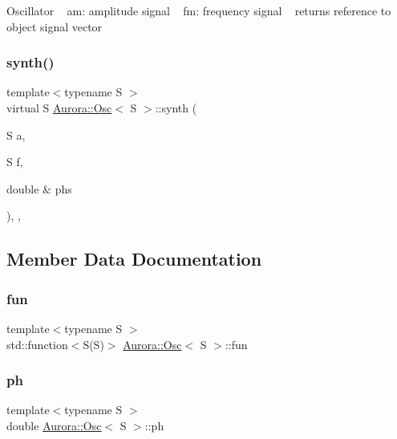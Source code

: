 Oscillator ~\newline
am\+: amplitude signal ~\newline
fm\+: frequency signal ~\newline
returns reference to object signal vector \mbox{\label{class_aurora_1_1_osc_a4e01fb1238c931c944b6b27c3790495e}} 
\subsubsection{\texorpdfstring{synth()}{synth()}}
{\footnotesize\ttfamily template$<$typename S $>$ \\
virtual S \hyperlink{class_aurora_1_1_osc}{Aurora\+::\+Osc}$<$ S $>$\+::synth (\begin{DoxyParamCaption}\item[{S}]{a,  }\item[{S}]{f,  }\item[{double \&}]{phs }\end{DoxyParamCaption})\hspace{0.3cm}{\ttfamily [inline]}, {\ttfamily [protected]}, {\ttfamily [virtual]}}



\subsection{Member Data Documentation}
\mbox{\label{class_aurora_1_1_osc_a18c443a23a6d1fc2e63ba1ee09e97bc4}} 
\subsubsection{\texorpdfstring{fun}{fun}}
{\footnotesize\ttfamily template$<$typename S $>$ \\
std\+::function$<$S(S)$>$ \hyperlink{class_aurora_1_1_osc}{Aurora\+::\+Osc}$<$ S $>$\+::fun\hspace{0.3cm}{\ttfamily [protected]}}

\mbox{\label{class_aurora_1_1_osc_ac649d41b585b377b17eeba66a18dbcc2}} 
\subsubsection{\texorpdfstring{ph}{ph}}
{\footnotesize\ttfamily template$<$typename S $>$ \\
double \hyperlink{class_aurora_1_1_osc}{Aurora\+::\+Osc}$<$ S $>$\+::ph\hspace{0.3cm}{\ttfamily [protected]}}

